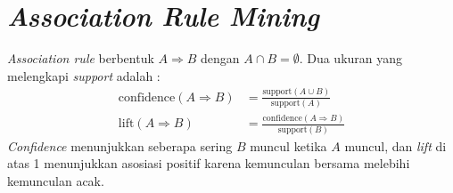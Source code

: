 \section{\textit{Association Rule Mining}}
\textit{Association rule} berbentuk $A \Rightarrow B$ dengan $A \cap B = \emptyset$. Dua ukuran yang melengkapi \textit{support} adalah \cite{han2012}:
\begin{align}
\mathrm{confidence}(A \Rightarrow B) &= \frac{\mathrm{support}(A \cup B)}{\mathrm{support}(A)} \\
\mathrm{lift}(A \Rightarrow B) &= \frac{\mathrm{confidence}(A \Rightarrow B)}{\mathrm{support}(B)}
\end{align}
\textit{Confidence} menunjukkan seberapa sering $B$ muncul ketika $A$ muncul, dan \textit{lift} di atas 1 menunjukkan asosiasi positif karena kemunculan bersama melebihi kemunculan acak.
